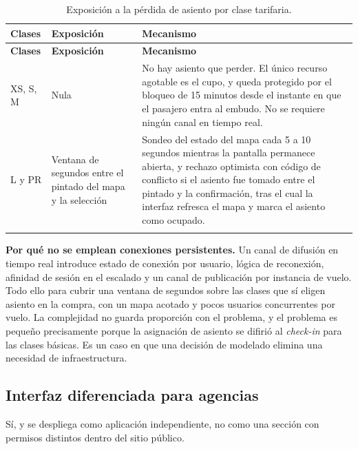 \documentclass[10pt,letterpaper]{article}
\newcommand{\nota}[1]{%
  \begin{tcolorbox}[colback=cajaFondo,colframe=usaAzul!60,sharp corners=south]#1\end{tcolorbox}}
\begin{document}
\begin{longtable}{@{}L{3.0cm} L{4.4cm} L{7.8cm}@{}}
\toprule \textbf{Clases} & \textbf{Exposición} & \textbf{Mecanismo} \\ \midrule \endfirsthead
\toprule \textbf{Clases} & \textbf{Exposición} & \textbf{Mecanismo} \\ \midrule \endhead
XS, S, M & Nula & No hay asiento que perder. El único recurso agotable es el cupo, y queda protegido por el bloqueo de 15 minutos desde el instante en que el pasajero entra al embudo. No se requiere ningún canal en tiempo real. \\
L y PR & Ventana de segundos entre el pintado del mapa y la selección & Sondeo del estado del mapa cada 5 a 10 segundos mientras la pantalla permanece abierta, y rechazo optimista con código de conflicto si el asiento fue tomado entre el pintado y la confirmación, tras el cual la interfaz refresca el mapa y marca el asiento como ocupado. \\
\bottomrule
\caption{Exposición a la pérdida de asiento por clase tarifaria.}
\end{longtable}

\nota{\textbf{Por qué no se emplean conexiones persistentes.} Un canal de difusión en tiempo real introduce estado de conexión por usuario, lógica de reconexión, afinidad de sesión en el escalado y un canal de publicación por instancia de vuelo. Todo ello para cubrir una ventana de segundos sobre las clases que sí eligen asiento en la compra, con un mapa acotado y pocos usuarios concurrentes por vuelo. La complejidad no guarda proporción con el problema, y el problema es pequeño precisamente porque la asignación de asiento se difirió al \emph{check-in} para las clases básicas. Es un caso en que una decisión de modelado elimina una necesidad de infraestructura.}

\subsection{Interfaz diferenciada para agencias}
Sí, y se despliega como aplicación independiente, no como una sección con permisos distintos dentro del sitio público.
\end{document}
